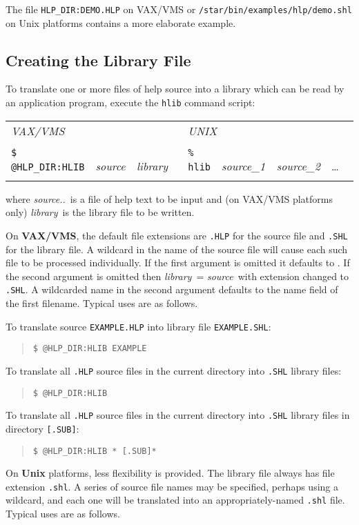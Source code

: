 The file {\tt HLP\_DIR:DEMO.HLP} on VAX/VMS or
{\tt /star/bin/examples/hlp/demo.shl} on Unix platforms
contains a more elaborate example.

\subsection{Creating the Library File}
To translate one or more files of help source into a library which can be
read by an application program, execute the {\tt hlib} command script:

\begin{tabular}{ll}
\\
{\it VAX/VMS} & {\it UNIX} \\ \\
{\tt \$ @HLP\_DIR:HLIB}~~{\it source~~library} &
   {\tt \% hlib}~~{\it source\_1~~source\_2}~~\ldots \\ \\
\end{tabular}

where {\it source..}\ is a file of help text to be
input and (on VAX/VMS
platforms only) {\it library}\, is the library file to be written.

On {\bf VAX/VMS}, the default file extensions are {\tt .HLP} for the
source file and {\tt .SHL} for the library file.  A wildcard in the name
of the source file will cause each such file to be processed
individually.  If the first argument is omitted it defaults to
\fstring{*}.  If the second argument is omitted then
{\it library}\, = {\it source}\, with
extension changed to {\tt .SHL}.  A wildcarded name in the second argument
defaults to the name field of the first filename.  Typical uses are
as follows.

To translate source {\tt EXAMPLE.HLP} into library file {\tt EXAMPLE.SHL}:
\begin{verse}
{\tt \$ @HLP\_DIR:HLIB EXAMPLE}
\end{verse}
To translate all {\tt *.HLP} source files in the current directory
into {\tt *.SHL} library files:
\begin{verse}
{\tt \$ @HLP\_DIR:HLIB}
\end{verse}
To translate all {\tt *.HLP} source files in the current directory into
{\tt *.SHL} library files in directory {\tt [.SUB]}:
\begin{verse}
{\tt \$ @HLP\_DIR:HLIB * [.SUB]*}
\end{verse}

On {\bf Unix} platforms, less flexibility is provided.  The library
file always has file extension {\tt .shl}.  A series of source file names
may be specified, perhaps using a wildcard, and each one will be
translated into an appropriately-named {\tt .shl} file.  Typical uses are
as follows.

